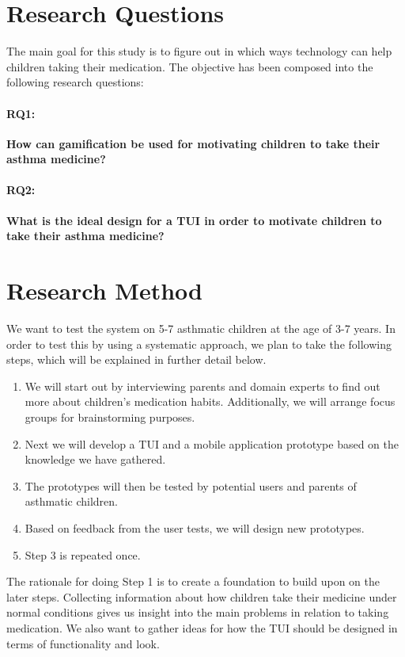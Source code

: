 \section{Research Questions}
\label{sec:researchquestions}
The main goal for this study is to figure out in which ways technology can help children taking their medication. The objective has been composed into the following research questions: 

\paragraph{RQ1:}
\textbf{How can gamification be used for motivating children to take their asthma medicine?}


\paragraph{RQ2:}
\textbf{What is the ideal design for a TUI in order to motivate children to take their asthma medicine?}

\section{Research Method}
\label{sec:researchmethod}

We want to test the system on 5-7 asthmatic children at the age of 3-7 years. In order to test this by using a systematic approach, we plan to take the following steps, which will be explained in further detail below. 

\begin{enumerate}
  \item We will start out by interviewing parents and domain experts to find out more about children's medication habits. Additionally, we will arrange focus groups for brainstorming purposes.
  \item Next we will develop a TUI and a mobile application prototype based on the knowledge we have gathered.  
  \item The prototypes will then be tested by potential users and parents of asthmatic children. 
  \item Based on feedback from the user tests, we will design new prototypes.
  \item Step 3 is repeated once.
\end{enumerate}
 

The rationale for doing Step 1 is to create a foundation to build upon on the later steps. 
Collecting information about how children take their medicine under normal conditions gives us insight into the main problems in relation to taking medication. We also want to gather ideas for how the TUI should be designed in terms of functionality and look. 

